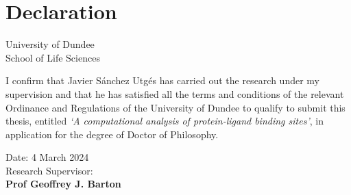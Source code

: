 \chapter*{Declaration} %

\begin{center}
    \LARGE University of Dundee\\[1cm]
    \LARGE School of Life Sciences\\[2cm]
\end{center}

I confirm that Javier Sánchez Utgés has carried out the research under my supervision and that he has satisfied all the terms and conditions of the relevant Ordinance and Regulations of the University of Dundee to qualify to submit this thesis, entitled \textit{`A computational analysis of protein-ligand binding sites'}, in application for the degree of Doctor of Philosophy.

\vfill

\begin{flushright}
    Date: 4 March 2024\\[1.5cm]
    Research Supervisor: \underline{\hspace{6cm}}\\[1cm]
    \textbf{Prof Geoffrey J. Barton}
\end{flushright}